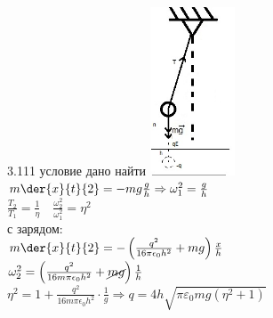 \testCom
{%
	3.111
}
{%
	условие
}
{%
	дано
}
{%
	найти
}
{%
	\includegraphics[height=50mm]{3_111.jpg}\\
	$m \der{x}{t}{2} = - mg \frac{g}{h} \Rightarrow \omega_1^2 = \frac{g}{h}$\\
	$\frac{T_2}{T_1} = \frac{1}{\eta} \quad \frac{\omega_2^2}{\omega_1^2} = \eta^2$\\
	с зарядом:	\\
	$m \der{x}{t}{2} = - \left( \frac{q^2}{16 \pi \epsilon_0 h^2}+ mg \right ) \frac{x}{h}$\\
	$\omega_2^2 = \left( \frac{q^2}{16 m \pi \epsilon_0 h^2} + \cancel{mg} \right) \frac{1}{h}$\\
	$\eta^2 = 1 + \frac{q^2}{16 m \pi \epsilon_0 h^2} \cdot \frac{1}{g} \Rightarrow q = 4 h \sqrt{\pi \varepsilon_0 mg (\eta^2 + 1)}$\\
}

